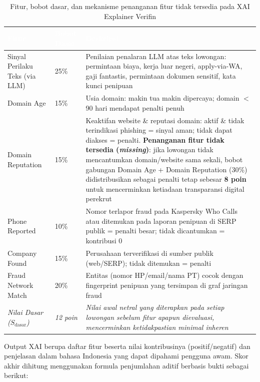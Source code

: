 \documentclass[12pt,a4paper]{article}
\newcommand{\thead}[1]{\textcolor{white}{\textbf{#1}}}
\begin{document}
\begin{adjustwidth}{1.45cm}{0pt}
\begin{table}[H]
\centering
\caption{Fitur, bobot dasar, dan mekanisme penanganan fitur tidak tersedia pada XAI Explainer Verifin}
\label{tab:xai-weights}
\small
\begin{tabularx}{\linewidth}{@{}L{3.8cm}C{2.0cm}Y@{}}
\toprule
{}\thead{Fitur} & \thead{Bobot Dasar} & \thead{Deskripsi} \\
\midrule
Sinyal Perilaku Teks (via LLM) & 25\% & Penilaian penalaran LLM atas teks lowongan: permintaan biaya, kerja luar negeri, apply-via-WA, gaji fantastis, permintaan dokumen sensitif, kata kunci penipuan \\
Domain Age & 15\% & Usia domain: makin tua makin dipercaya; domain $<$90 hari mendapat penalti penuh \\
Domain Reputation & 15\% & Keaktifan website \& reputasi domain: aktif \& tidak terindikasi phishing = sinyal aman; tidak dapat diakses = penalti. \textbf{Penanganan fitur tidak tersedia (\textit{missing})}: jika lowongan tidak mencantumkan domain/website sama sekali, bobot gabungan Domain Age + Domain Reputation (30\%) didistribusikan sebagai penalti tetap sebesar \textbf{8 poin} untuk mencerminkan ketiadaan transparansi digital perekrut \\
Phone Reported & 10\% & Nomor terlapor fraud pada Kaspersky Who Calls atau ditemukan pada laporan penipuan di SERP publik = penalti besar; tidak dicantumkan = kontribusi 0 \\
Company Found & 15\% & Perusahaan terverifikasi di sumber publik (web/SERP); tidak ditemukan = penalti \\
Fraud Network Match & 20\% & Entitas (nomor HP/email/nama PT) cocok dengan fingerprint penipuan yang tersimpan di graf jaringan fraud \\
\midrule
\textit{Nilai Dasar ($S_{\text{dasar}}$)} & \textit{12 poin} & \textit{Nilai awal netral yang diterapkan pada setiap lowongan sebelum fitur apapun dievaluasi, mencerminkan ketidakpastian minimal inheren} \\
\bottomrule
\end{tabularx}
\end{table}
\end{adjustwidth}

Output XAI berupa daftar fitur beserta nilai kontribusinya (positif/negatif) dan penjelasan
dalam bahasa Indonesia yang dapat dipahami pengguna awam. Skor akhir dihitung menggunakan
formula penjumlahan aditif berbasis bukti sebagai berikut:
\end{document}
